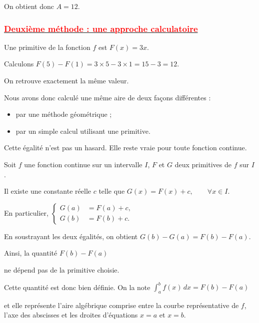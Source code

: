 \documentclass[12pt,a4paper]{article}
\begin{document}
On obtient donc \(A=12.\)

\vspace{0.4cm}

\subsubsection*{\underline{\textbf{\textcolor{red}{ Deuxième méthode : une approche calculatoire }}}}

Une primitive de la fonction \(f\) est \( F(x)=3x. \)\vspace{0.4cm}

Calculons \( F(5)-F(1)
=3\times5-3\times1
=15-3
=12. \)\vspace{0.4cm}

On retrouve exactement la même valeur.

\vspace{0.4cm}

Nous avons donc calculé une même aire de deux façons différentes :

\begin{itemize}
    \item par une méthode géométrique ;
    \item par un simple calcul utilisant une primitive.
\end{itemize}

Cette égalité n'est pas un hasard. Elle reste vraie pour toute fonction continue.

\vspace{0.4cm}

Soit \(f\) une fonction continue sur un intervalle \(I\), \(F\) et \(G\) deux primitives de \(f\) sur \(I\).

Il existe une constante réelle \(c\) telle que \( G(x)=F(x)+c,\qquad \forall x\in I. \)\vspace{0.4cm}

En particulier,
\( \left\{
\begin{aligned}
G(a)&=F(a)+c,\\
G(b)&=F(b)+c.
\end{aligned}
\right. \)

En soustrayant les deux égalités, on obtient \( G(b)-G(a)=F(b)-F(a). \)

Ainsi, la quantité \( F(b)-F(a) \)

ne dépend pas de la primitive choisie.

Cette quantité est donc bien définie. On la note \( \boxed{\int_a^b f(x)\,dx=F(b)-F(a)} \)

et elle représente l'aire algébrique comprise entre la courbe représentative de \(f\), l'axe des abscisses et les droites d'équations \(x=a\) et \(x=b\).
\end{document}

